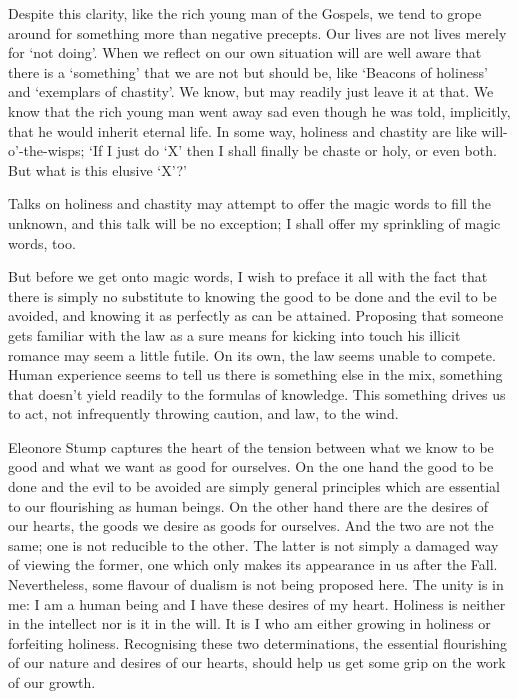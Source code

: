 \documentclass[12pt]{article}
\begin{document}
Despite this clarity, like the rich young man of the Gospels, we tend to grope around for something more than negative precepts. Our lives are not lives merely for `not doing'. When we reflect on our own situation will are well aware that there is a `something' that we are not but should be, like `Beacons of holiness' and `exemplars of chastity'. We know, but may readily just leave it at that. We know that the rich young man went away sad even though he was told, implicitly, that he would inherit eternal life. In some way, holiness and chastity are like will-o'-the-wisps; `If I just do `X' then I shall finally be chaste or holy, or even both. But what is this elusive `X'?'

Talks on holiness and chastity may attempt to offer the magic words to fill the unknown, and this talk will be no exception; I shall offer my sprinkling of magic words, too.

But before we get onto magic words, I wish to preface it all with the fact that there is simply no substitute to knowing the good to be done and the evil to be avoided, and knowing it as perfectly as can be attained. Proposing that someone gets familiar with the law as a sure means for kicking into touch his illicit romance may seem a little futile. On its own, the law seems unable to compete. Human experience seems to tell us there is something else in the mix, something that doesn't yield readily to the formulas of knowledge. This something drives us to act, not infrequently throwing caution, and law, to the wind.

Eleonore Stump captures the heart of the tension between what we know to be good and what we want as good for ourselves. On the one hand the good to be done and the evil to be avoided are simply general principles which are essential to our flourishing as human beings. On the other hand there are the desires of our hearts, the goods we desire as goods for ourselves. And the two are not the same; one is not reducible to the other. The latter is not simply a damaged way of viewing the former, one which only makes its appearance in us after the Fall. Nevertheless, some flavour of dualism is not being proposed here. The unity is in me: I am a human being and I have these desires of my heart. Holiness is neither in the intellect nor is it in the will. It is I who am either growing in holiness or forfeiting holiness. Recognising these two determinations, the essential flourishing of our nature and desires of our hearts, should help us get some grip on the work of our growth.
\end{document}
